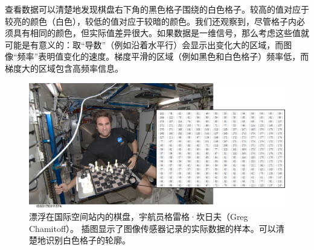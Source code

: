 
查看数据可以清楚地发现棋盘右下角的黑色格子围绕的白色格子。较高的值对应于较亮的颜色（白色），较低的值对应于较暗的颜色。我们还观察到，尽管格子内必须具有相同的颜色，但实际值差异很大。如果数据是一维信号，那么考虑这些值就可能是有意义的：取“导数”（例如沿着水平行）会显示出变化大的区域，而图像“频率”表明值变化的速度。梯度平滑的区域（例如黑色和白色格子）频率低，而梯度大的区域包含高频率信息。


\begin{figure}[!htb]
	\centering
		\includegraphics[width=\textwidth]{figs/iss_closeupmatrix}
	\caption{漂浮在国际空间站内的棋盘，宇航员格雷格·坎日夫（Greg Chamitoff）。 插图显示了图像传感器记录的实际数据的样本。可以清楚地识别白色格子的轮廓。}
	\label{fig:iss_closeup}
\end{figure}


